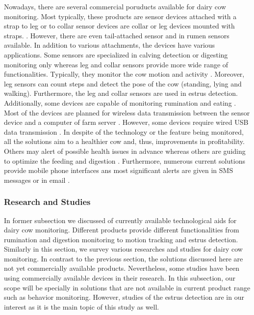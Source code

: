 \documentclass[english,12pt,a4paper,pdftex,elec,utf8]{aaltothesis}
\begin{document}
Nowadays, there are several commercial poruducts available for dairy cow monitoring. Most typically, these products are sensor devices attached with a strap to leg \cite{iceroboticproductbrochure,geacowscout} or to collar \cite{heatime,geacowscout,moocall} sensor devices are collar or leg devices mounted with straps. \cite{heatime} \cite{iceroboticproductbrochure}. However, there are even tail-attached sensor \cite{moocall} and in rumen \cite{wellcowbolus} sensors available. In addition to various attachments, the devices have various applications. Some sensors are specialized in calving detection \cite{moocall} or digesting monitoring \cite{wellcowbolus} only whereas leg and collar sensors provide more wide range of functionalities. Typically, they monitor the cow motion and activity \cite{iceroboticproductbrochure, heatime, geacowscout, moocall}. Moreover, leg sensors can count steps and detect the pose of the cow (standing, lying and walking). Furthermore, the leg and collar sensors are used in estrus detection. Additionally, some devices are capable of monitoring rumination \cite{heatime} and eating \cite{geacowscout}. Most of the devices are planned for wireless data transmission between the sensor device and a computer of farm server \cite{heatime} \cite{geacowscout} \cite{iceroboticproductbrochure} \cite{wellcowbolus}. However, some devices require wired USB data transmission \cite{iceroboticproductbrochure}. In despite of the technology or the feature being monitored, all the solutions aim to a healthier cow and, thus, improvements in profitability. Others may alert of possible health issues in advance \cite{heatime, geacowscout, iceroboticproductbrochure} whereas others are guiding to optimize the feeding and digestion \cite{wellcowbolus}. Furthermore, numerous current solutions provide mobile phone interfaces ans most significant alerts are given in SMS messages or in email \cite{heatime}.


\subsubsection{Research and Studies} \label{researchandstudiessection}

In former subsection we discussed of currently available technological aids for dairy cow monitoring. Different products provide different functionalities from rumination and digestion monitoring to motion tracking and estrus detection. Similarly in this section, we survey various researches and studies for dairy cow monitoring. In contrast to the previous section, the solutions discussed here are not yet commercially available products. Nevertheless, some studies have been using commercially available devices in their research. In this subsection, our scope will be specially in solutions that are not available in current product range such as behavior monitoring. However, studies of the estrus detection are in our interest as it is the main topic of this study as well. 
\end{document}
